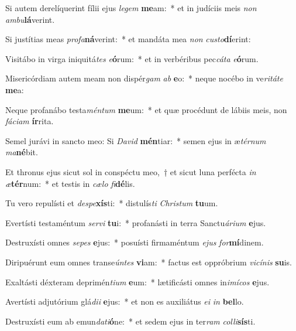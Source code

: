 \item Si autem derelíquerint fílii ejus \textit{le}\textit{gem} \textbf{me}am:~* et in judíciis meis \textit{non} \textit{am}\textit{bu}\textbf{lá}verint.
\item Si justítias meas \textit{pro}\textit{fa}\textbf{ná}verint:~* et mandáta mea \textit{non} \textit{cus}\textit{to}\textbf{dí}erint:
\item Visitábo in virga iniquitá\textit{tes} \textit{e}\textbf{ó}rum:~* et in verbéribus pec\textit{cá}\textit{ta} \textit{e}\textbf{ó}rum.
\item Misericórdiam autem meam non dispér\textit{gam} \textit{ab} \textbf{e}o:~* neque nocébo in ve\textit{ri}\textit{tá}\textit{te} \textbf{me}a:
\item Neque profanábo testa\textit{mén}\textit{tum} \textbf{me}um:~* et quæ procédunt de lábiis meis, non \textit{fá}\textit{ci}\textit{am} \textbf{ír}rita.
\item Semel jurávi in sancto meo: Si \textit{Da}\textit{vid} \textbf{mén}tiar:~* semen ejus in æ\textit{tér}\textit{num} \textit{ma}\textbf{né}bit.
\item Et thronus ejus sicut sol in conspéctu meo,~† et sicut luna perfécta \textit{in} \textit{æ}\textbf{tér}num:~* et testis in \textit{cæ}\textit{lo} \textit{fi}\textbf{dé}lis.
\item Tu vero repulísti et \textit{de}\textit{spe}\textbf{xís}ti:~* distulís\textit{ti} \textit{Chris}\textit{tum} \textbf{tu}um.
\item Evertísti testaméntum \textit{ser}\textit{vi} \textbf{tu}i:~* profanásti in terra Sanctu\textit{á}\textit{ri}\textit{um} \textbf{e}jus.
\item Destruxísti omnes \textit{se}\textit{pes} \textbf{e}jus:~* posuísti firmaméntum \textit{e}\textit{jus} \textit{for}\textbf{mí}dinem.
\item Diripuérunt eum omnes transe\textit{ún}\textit{tes} \textbf{vi}am:~* factus est oppróbrium \textit{vi}\textit{cí}\textit{nis} \textbf{su}is.
\item Exaltásti déxteram deprimén\textit{ti}\textit{um} \textbf{e}um:~* lætificásti omnes in\textit{i}\textit{mí}\textit{cos} \textbf{e}jus.
\item Avertísti adjutórium glá\textit{di}\textit{i} \textbf{e}jus:~* et non es auxiliátus \textit{e}\textit{i} \textit{in} \textbf{bel}lo.
\item Destruxísti eum ab emun\textit{da}\textit{ti}\textbf{ó}ne:~* et sedem ejus in ter\textit{ram} \textit{col}\textit{li}\textbf{sís}ti.
